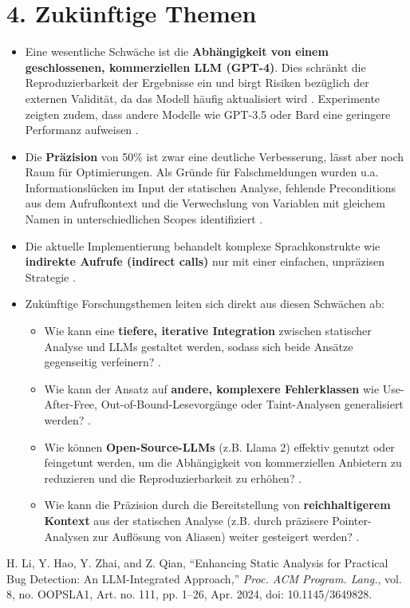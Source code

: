 \documentclass{article}
\begin{document}
\section*{4. Zukünftige Themen}
\begin{itemize}
    \item Eine wesentliche Schwäche ist die \textbf{Abhängigkeit von einem geschlossenen, kommerziellen LLM (GPT-4)}. Dies schränkt die Reproduzierbarkeit der Ergebnisse ein und birgt Risiken bezüglich der externen Validität, da das Modell häufig aktualisiert wird \cite{Li2024}. Experimente zeigten zudem, dass andere Modelle wie GPT-3.5 oder Bard eine geringere Performanz aufweisen \cite{Li2024}.
    \item Die \textbf{Präzision} von 50\% ist zwar eine deutliche Verbesserung, lässt aber noch Raum für Optimierungen. Als Gründe für Falschmeldungen wurden u.a. Informationslücken im Input der statischen Analyse, fehlende Preconditions aus dem Aufrufkontext und die Verwechslung von Variablen mit gleichem Namen in unterschiedlichen Scopes identifiziert \cite{Li2024}.
    \item Die aktuelle Implementierung behandelt komplexe Sprachkonstrukte wie \textbf{indirekte Aufrufe (indirect calls)} nur mit einer einfachen, unpräzisen Strategie \cite{Li2024}.
    \item Zukünftige Forschungsthemen leiten sich direkt aus diesen Schwächen ab:
        \begin{itemize}
            \item Wie kann eine \textbf{tiefere, iterative Integration} zwischen statischer Analyse und LLMs gestaltet werden, sodass sich beide Ansätze gegenseitig verfeinern? \cite{Li2024}.
            \item Wie kann der Ansatz auf \textbf{andere, komplexere Fehlerklassen} wie Use-After-Free, Out-of-Bound-Lesevorgänge oder Taint-Analysen generalisiert werden? \cite{Li2024}.
            \item Wie können \textbf{Open-Source-LLMs} (z.B. Llama 2) effektiv genutzt oder feingetunt werden, um die Abhängigkeit von kommerziellen Anbietern zu reduzieren und die Reproduzierbarkeit zu erhöhen? \cite{Li2024}.
            \item Wie kann die Präzision durch die Bereitstellung von \textbf{reichhaltigerem Kontext} aus der statischen Analyse (z.B. durch präzisere Pointer-Analysen zur Auflösung von Aliasen) weiter gesteigert werden? \cite{Li2024}.
        \end{itemize}
\end{itemize}

\begin{thebibliography}{9}
    H. Li, Y. Hao, Y. Zhai, and Z. Qian,
    ``Enhancing Static Analysis for Practical Bug Detection: An LLM-Integrated Approach,''
    \textit{Proc. ACM Program. Lang.}, vol. 8, no. OOPSLA1, Art. no. 111, pp. 1--26, Apr. 2024, doi: 10.1145/3649828.
\end{thebibliography}
\end{document}
